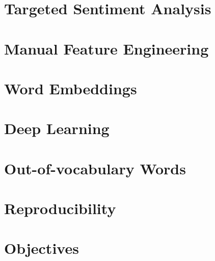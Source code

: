 \documentclass[../../fyp.tex]{subfiles}
\begin{document}
\section{Targeted Sentiment Analysis}


\section{Manual Feature Engineering}


\section{Word Embeddings}


\section{Deep Learning}


\section{Out-of-vocabulary Words}


\section{Reproducibility}


\section{Objectives} \label{sec:objectives}

\end{document}

